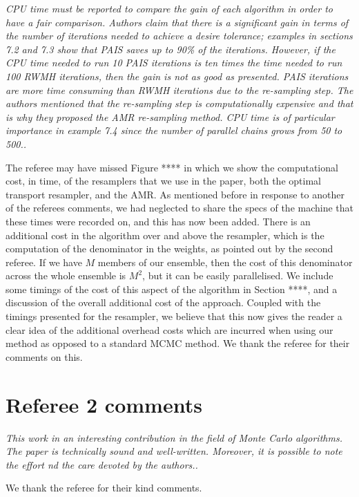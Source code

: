 \documentclass{article}
\newcommand{\comment}[2]{\vspace{0.6cm}{\bf Comment:} {\it #1.}

\vspace{0.3cm}{\bf Answer:} #2}
\begin{document}
\comment{CPU time must be reported to compare the gain of each algorithm in 
order to have a fair comparison. Authors claim that there is a significant 
gain in terms of the number of iterations needed to achieve a desire 
tolerance; examples in sections 7.2 and 7.3 show that PAIS saves up to 90\% of 
the iterations. However, if the CPU time needed to run 10 PAIS iterations is 
ten times the time needed to run 100 RWMH iterations, then the gain is not as 
good as presented. PAIS iterations are more time consuming than RWMH iterations 
due to the re-sampling step. The authors mentioned that the re-sampling step is 
computationally expensive and that is why they proposed the AMR re-sampling 
method. CPU time is of particular importance in example 7.4 since the number of 
parallel chains grows from 50 to 500.}{The referee may have missed Figure **** in which we show the computational cost, in time, of the resamplers that we use in the paper, both the optimal transport resampler, and the AMR. As mentioned before in response to another of the referees comments, we had neglected to share the specs of the machine that these times were recorded on, and this has now been added. There is an additional cost in the algorithm over and above the resampler, which is the computation of the denominator in the weights, as pointed out by the second referee. If we have $M$ members of our ensemble, then the cost of this denominator across the whole ensemble is $M^2$, but it can be easily parallelised. We include some timings of the cost of this aspect of the algorithm in Section ****, and a discussion of the overall additional cost of the approach. Coupled with the timings presented for the resampler, we believe that this now gives the reader a clear idea of the additional overhead costs which are incurred when using our method as opposed to a standard MCMC method. We thank the referee for their comments on this.}



\section*{Referee 2 comments}

\comment{This work in an interesting contribution in the field of Monte Carlo algorithms. The paper is technically sound and well-written. 
Moreover, it is possible to note the effort nd the care devoted by the authors.}{We thank the referee for their kind comments.}
\end{document}
